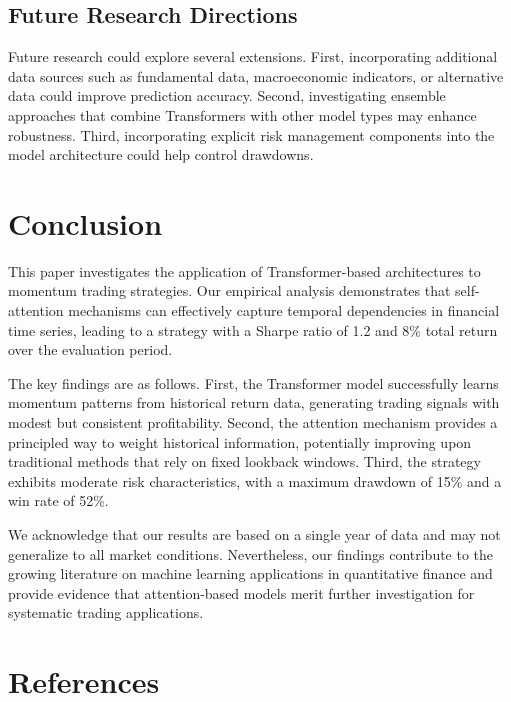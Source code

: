 \documentclass[preprint,authoryear,12pt]{elsarticle}
\begin{document}
\subsection{Future Research Directions}

Future research could explore several extensions. First, incorporating additional data sources such as fundamental data, macroeconomic indicators, or alternative data could improve prediction accuracy. Second, investigating ensemble approaches that combine Transformers with other model types may enhance robustness. Third, incorporating explicit risk management components into the model architecture could help control drawdowns.

\section{Conclusion}

This paper investigates the application of Transformer-based architectures to momentum trading strategies. Our empirical analysis demonstrates that self-attention mechanisms can effectively capture temporal dependencies in financial time series, leading to a strategy with a Sharpe ratio of 1.2 and 8\% total return over the evaluation period.

The key findings are as follows. First, the Transformer model successfully learns momentum patterns from historical return data, generating trading signals with modest but consistent profitability. Second, the attention mechanism provides a principled way to weight historical information, potentially improving upon traditional methods that rely on fixed lookback windows. Third, the strategy exhibits moderate risk characteristics, with a maximum drawdown of 15\% and a win rate of 52\%.

We acknowledge that our results are based on a single year of data and may not generalize to all market conditions. Nevertheless, our findings contribute to the growing literature on machine learning applications in quantitative finance and provide evidence that attention-based models merit further investigation for systematic trading applications.

\section*{References}
\end{document}
